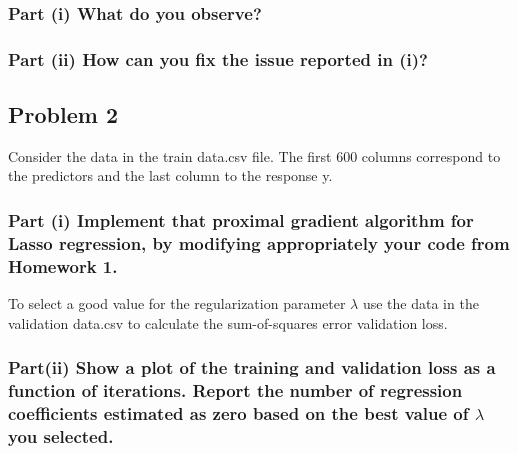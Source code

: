 \documentclass[
  letterpaper,
  DIV=11,
  numbers=noendperiod]{scrartcl}
\begin{document}
\subsubsection{Part (i) What do you
observe?}\label{part-i-what-do-you-observe}

\subsubsection{Part (ii) How can you fix the issue reported in
(i)?}\label{part-ii-how-can-you-fix-the-issue-reported-in-i}

\newpage

\subsection{Problem 2}\label{problem-2}

Consider the data in the train data.csv file. The first 600 columns
correspond to the predictors and the last column to the response y.

\subsubsection{Part (i) Implement that proximal gradient algorithm for
Lasso regression, by modifying appropriately your code from Homework
1.}\label{part-i-implement-that-proximal-gradient-algorithm-for-lasso-regression-by-modifying-appropriately-your-code-from-homework-1.}

To select a good value for the regularization parameter \(λ\) use the
data in the validation data.csv to calculate the sum-of-squares error
validation loss.

\subsubsection{\texorpdfstring{Part(ii) Show a plot of the training and
validation loss as a function of iterations. Report the number of
regression coefficients estimated as zero based on the best value of
\(λ\) you
selected.}{Part(ii) Show a plot of the training and validation loss as a function of iterations. Report the number of regression coefficients estimated as zero based on the best value of λ you selected.}}\label{partii-show-a-plot-of-the-training-and-validation-loss-as-a-function-of-iterations.-report-the-number-of-regression-coefficients-estimated-as-zero-based-on-the-best-value-of-ux3bb-you-selected.}
\end{document}
